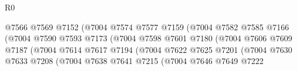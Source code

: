 \begin{lexlean}{R0}
\begin{coremodule}
                                              @7566
                                              @7569
                                              @7152
                                              (@7004
                                                @7574
                                                @7577
                                                @7159
                                                (@7004
                                                  @7582
                                                  @7585
                                                  @7166
                                                  (@7004
                                                    @7590
                                                    @7593
                                                    @7173
                                                    (@7004
                                                      @7598
                                                      @7601
                                                      @7180
                                                      (@7004
                                                        @7606
                                                        @7609
                                                        @7187
                                                        (@7004
                                                          @7614
                                                          @7617
                                                          @7194
                                                          (@7004
                                                            @7622
                                                            @7625
                                                            @7201
                                                            (@7004
                                                              @7630
                                                              @7633
                                                              @7208
                                                              (@7004
                                                                @7638
                                                                @7641
                                                                @7215
                                                                (@7004
                                                                  @7646
                                                                  @7649
                                                                  @7222

\end{coremodule}
\end{lexlean}
